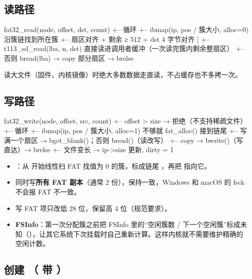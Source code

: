 \subsection{读路径}

\begin{txtcode}
fat32_read(node, offset, dst, count)
+-- 循环
    +-- ibmap(ip, pos / 簇大小, alloc=0)   沿簇链找到所在簇
    +-- 扇区对齐 + 剩余 ≥ 512 + dst 4 字节对齐
    |   +-- t113_sd_read(lba, n, dst) 直接读进调用者缓冲（一次读完簇内剩余整扇区）
    +-- 否则 bread(lba) → copy 部分扇区 → brelse
\end{txtcode}

读大文件（固件、内核镜像）时绝大多数数据走直读，不占缓存也不多拷一次。

\subsection{写路径}

\begin{txtcode}
fat32_write(node, offset, src, count)
+-- offset > size → 拒绝（不支持稀疏文件）
+-- 循环
    +-- ibmap(ip, pos / 簇大小, alloc=1)   不够就 fat_alloc() 接到链尾
    +-- 写满一个扇区 → bget_blank()；否则 bread()（读改写）
    +-- copy → bwrite()（写直达）→ brelse
    +-- 文件变长 → ip->size 更新, dirty = 1
\end{txtcode}

\begin{itemize}
  \item {}：从  开始线性扫 FAT 找值为 0 的簇，标成链尾 ，再把  指向它。
  \item {} 同时写\textbf{所有 FAT 副本}（通常 2 份），保持一致，Windows 和 macOS 的 fsck 不会报 FAT 不一致。
  \item 写 FAT 项只改低 28 位，保留高 4 位（规范要求）。
  \item \textbf{FSInfo}：第一次分配簇之前把 FSInfo 里的``空闲簇数 / 下一个空闲簇''标成未知（），让其它系统下次挂载时自己重新计算。这样内核就不需要维护精确的空闲计数。
\end{itemize}

\subsection{创建 （ 带 ）}

